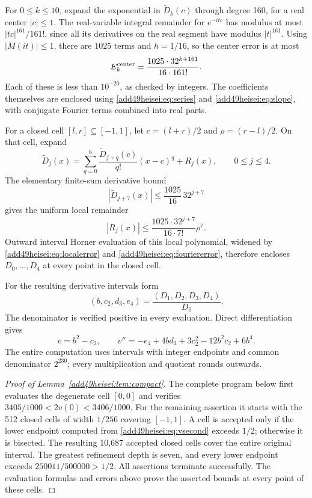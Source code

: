 \documentclass[11pt,a4paper]{article}
\numberwithin{equation}{section}
\theoremstyle{definition}
\theoremstyle{remark}
\begin{document}
For $0\le k\le10$, expand the exponential in
$\widetilde D_k(c)$ through degree 160, for a real center $|c|\le1$.
The real-variable integral remainder for $e^{-itc}$ has modulus at most
$|tc|^{161}/161!$, since all its derivatives on the real segment have
modulus $|t|^{161}$. Using $|M(it)|\le1$, there are $1025$ terms and
$h=1/16$, so the center error is at most
\begin{equation}\label{add49heisei:eq:centererror}
 E_k^{\rm center}=\frac{1025\cdot32^{k+161}}{16\cdot161!}.
\end{equation}
Each of these is less than $10^{-20}$, as checked by integers.
The coefficients themselves are enclosed using \eqref{add49heisei:eq:series} and
\eqref{add49heisei:eq:slope}, with conjugate Fourier terms combined into real parts.

For a closed cell $[l,r]\subseteq[-1,1]$, let
$c=(l+r)/2$ and $\rho=(r-l)/2$. On that cell, expand
\[
 \widetilde D_j(x)=\sum_{q=0}^{6}
 \frac{\widetilde D_{j+q}(c)}{q!}(x-c)^q+R_j(x),\qquad0\le j\le4.
\]
The elementary finite-sum derivative bound
\[
 |\widetilde D_{j+7}(x)|\le\frac{1025}{16}\,32^{j+7}
\]
gives the uniform local remainder
\begin{equation}\label{add49heisei:eq:localerror}
 |R_j(x)|\le\frac{1025\cdot32^{j+7}}{16\cdot7!}\rho^7.
\end{equation}
Outward interval Horner evaluation of this local polynomial, widened by
\eqref{add49heisei:eq:localerror} and \eqref{add49heisei:eq:fouriererror}, therefore encloses
$D_0,\ldots,D_4$ at every point in the closed cell.

For the resulting derivative intervals form
\[
 (b,c_2,d_3,e_4)=\frac{(D_1,D_2,D_3,D_4)}{D_0}.
\]
The denominator is verified positive in every evaluation. Direct
differentiation gives
\begin{equation}\label{add49heisei:eq:vsecond}
 v=b^2-c_2,\qquad
 v''=-e_4+4bd_3+3c_2^2-12b^2c_2+6b^4.
\end{equation}
The entire computation uses intervals with integer endpoints and common
denominator $2^{230}$; every multiplication and quotient rounds outwards.

\begin{proof}[Proof of Lemma~\ref{add49heisei:lem:compact}]
The complete program below first evaluates the degenerate cell $[0,0]$
and verifies $3405/1000<2v(0)<3406/1000$.
For the remaining assertion it starts with the 512 closed cells of width
$1/256$ covering $[-1,1]$. A cell is accepted only if the lower endpoint
computed from \eqref{add49heisei:eq:vsecond} exceeds $1/2$; otherwise it is bisected.
The resulting 10,687 accepted closed cells cover the entire original
interval. The greatest refinement depth is seven, and every lower
endpoint exceeds $250011/500000>1/2$. All assertions terminate
successfully. The evaluation formulas and errors above prove the
asserted bounds at every point of these cells.
\end{proof}
\end{document}
